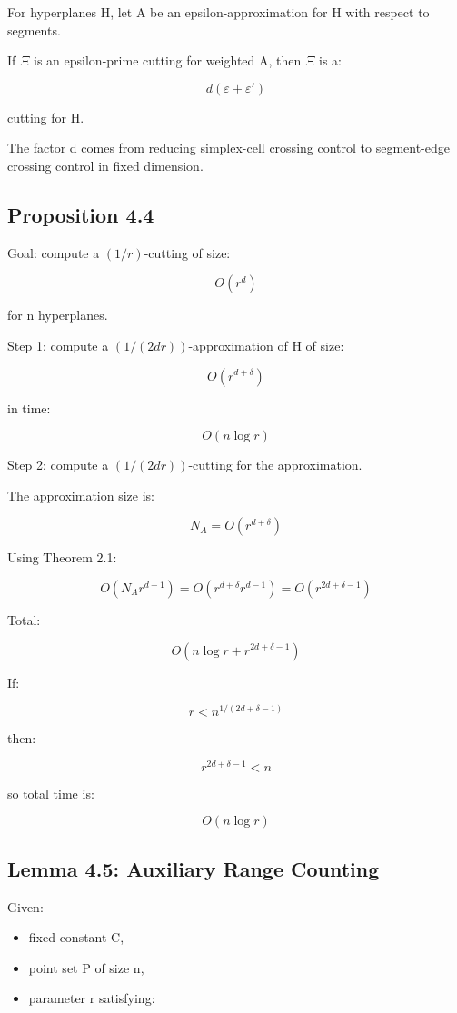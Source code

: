 \documentclass[
  11pt,
]{article}
\providecommand{\tightlist}{%
  \setlength{\itemsep}{0pt}\setlength{\parskip}{0pt}}
\begin{document}
For hyperplanes H, let A be an epsilon-approximation for H with respect
to segments.

If \(\Xi\) is an epsilon-prime cutting for weighted A, then \(\Xi\) is
a:

\[
d(\varepsilon+\varepsilon')
\]

cutting for H.

The factor d comes from reducing simplex-cell crossing control to
segment-edge crossing control in fixed dimension.

\hypertarget{proposition-4.4}{%
\subsection{Proposition 4.4}\label{proposition-4.4}}

Goal: compute a \((1/r)\)-cutting of size:

\[
O(r^d)
\]

for n hyperplanes.

Step 1: compute a \((1/(2dr))\)-approximation of H of size:

\[
O(r^{d+\delta})
\]

in time:

\[
O(n\log r)
\]

Step 2: compute a \((1/(2dr))\)-cutting for the approximation.

The approximation size is:

\[
N_A=O(r^{d+\delta})
\]

Using Theorem 2.1:

\[
O(N_A r^{d-1}) = O(r^{d+\delta}r^{d-1}) = O(r^{2d+\delta-1})
\]

Total:

\[
O(n\log r+r^{2d+\delta-1})
\]

If:

\[
r< n^{1/(2d+\delta-1)}
\]

then:

\[
r^{2d+\delta-1}< n
\]

so total time is:

\[
O(n\log r)
\]

\hypertarget{lemma-4.5-auxiliary-range-counting}{%
\subsection{Lemma 4.5: Auxiliary Range
Counting}\label{lemma-4.5-auxiliary-range-counting}}

Given:

\begin{itemize}
\tightlist
\item
  fixed constant C,
\item
  point set P of size n,
\item
  parameter r satisfying:
\end{itemize}
\end{document}
